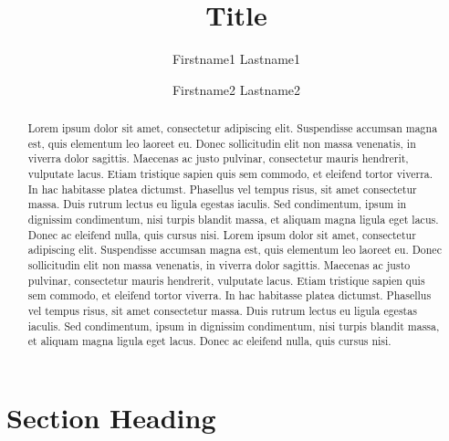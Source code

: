 \documentclass{winnower}
\begin{document}
\title{Title}

\author{Firstname1 Lastname1}
\author{Firstname2 Lastname2}

\date{}

\maketitle

\begin{abstract}
Lorem ipsum dolor sit amet, consectetur adipiscing elit. Suspendisse accumsan magna est, quis elementum leo laoreet eu. Donec sollicitudin elit non massa venenatis, in viverra dolor sagittis. Maecenas ac justo pulvinar, consectetur mauris hendrerit, vulputate lacus. Etiam tristique sapien quis sem commodo, et eleifend tortor viverra. In hac habitasse platea dictumst. Phasellus vel tempus risus, sit amet consectetur massa. Duis rutrum lectus eu ligula egestas iaculis. Sed condimentum, ipsum in dignissim condimentum, nisi turpis blandit massa, et aliquam magna ligula eget lacus. Donec ac eleifend nulla, quis cursus nisi. Lorem ipsum dolor sit amet, consectetur adipiscing elit. Suspendisse accumsan magna est, quis elementum leo laoreet eu. Donec sollicitudin elit non massa venenatis, in viverra dolor sagittis. Maecenas ac justo pulvinar, consectetur mauris hendrerit, vulputate lacus. Etiam tristique sapien quis sem commodo, et eleifend tortor viverra. In hac habitasse platea dictumst. Phasellus vel tempus risus, sit amet consectetur massa. Duis rutrum lectus eu ligula egestas iaculis. Sed condimentum, ipsum in dignissim condimentum, nisi turpis blandit massa, et aliquam magna ligula eget lacus. Donec ac eleifend nulla, quis cursus nisi.
\end{abstract}


\section{Section Heading}
\end{document}
